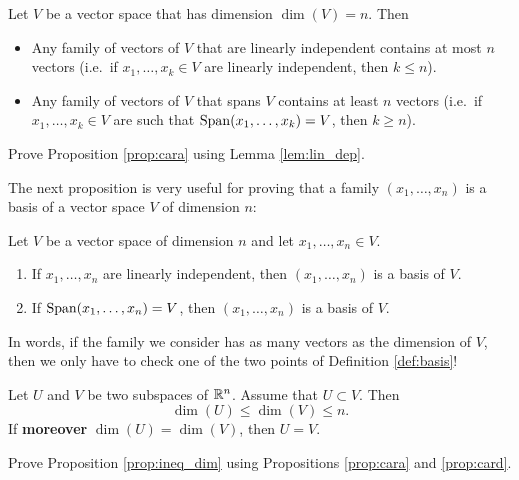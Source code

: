 \documentclass[11pt,nocut]{article}
\begin{document}
\begin{proposition}\label{prop:cara}
	Let $V$ be a vector space that has dimension $\dim(V) = n$. Then
	\begin{itemize}
		\item Any family of vectors of $V$ that are linearly independent contains at most $n$ vectors (i.e.\ if $x_1, \dots, x_k \in V$ are linearly independent, then $k \leq n$).
		\item Any family of vectors of $V$ that spans $V$ contains at least $n$ vectors (i.e.\ if $x_1, \dots, x_k \in V$ are such that ${{\rm Span}}(x_1, \dots, x_k) = V$, then $k \geq n$).
	\end{itemize}
\end{proposition}
\begin{exercise}
	Prove Proposition \ref{prop:cara} using Lemma \ref{lem:lin_dep}.
\end{exercise}

The next proposition is very useful for proving that a family $(x_1, \dots, x_n)$ is a basis of a vector space $V$ of dimension $n$:
\begin{proposition}\label{prop:card}
		Let $V$ be a vector space of dimension $n$ and let $x_1, \dots, x_n \in V$.
		\begin{enumerate}
			\item If $x_1, \dots, x_n$ are linearly independent, then $(x_1, \dots, x_n)$ is a basis of $V$.
			\item If ${{\rm Span}}(x_1, \dots, x_n) = V$, then $(x_1, \dots, x_n)$ is a basis of $V$.
		\end{enumerate}
	\end{proposition}

	In words, if the family we consider has as many vectors as the dimension of $V$, then we only have to check one of the two points of Definition \ref{def:basis}!

	\begin{proposition}\label{prop:ineq_dim}
	Let	$U$ and $V$ be two subspaces of $\mathbb{R}^n$. Assume that $U \subset V$. Then
	$$
	\dim(U) \leq \dim(V) \leq n.
	$$
	If \textbf{moreover} $\dim(U) = \dim(V)$, then $U = V$.
\end{proposition}
\begin{exercise}
	Prove Proposition \ref{prop:ineq_dim} using Propositions \ref{prop:cara} and \ref{prop:card}.
\end{exercise}
\end{document}
